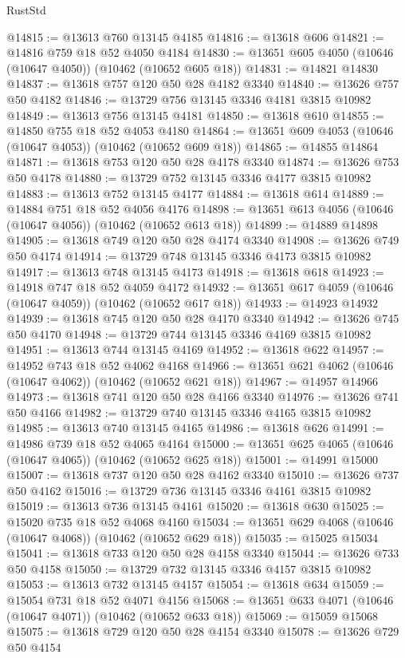\begin{lexlean}{RustStd}
\begin{coremodule}
@14815 := @13613 @760 @13145 @4185
@14816 := @13618 @606
@14821 := @14816 @759 @18 @52 @4050 @4184
@14830 := @13651 @605 @4050 (@10646 (@10647 @4050)) (@10462 (@10652 @605 @18))
@14831 := @14821 @14830
@14837 := @13618 @757 @120 @50 @28 @4182 @3340
@14840 := @13626 @757 @50 @4182
@14846 := @13729 @756 @13145 @3346 @4181 @3815 @10982
@14849 := @13613 @756 @13145 @4181
@14850 := @13618 @610
@14855 := @14850 @755 @18 @52 @4053 @4180
@14864 := @13651 @609 @4053 (@10646 (@10647 @4053)) (@10462 (@10652 @609 @18))
@14865 := @14855 @14864
@14871 := @13618 @753 @120 @50 @28 @4178 @3340
@14874 := @13626 @753 @50 @4178
@14880 := @13729 @752 @13145 @3346 @4177 @3815 @10982
@14883 := @13613 @752 @13145 @4177
@14884 := @13618 @614
@14889 := @14884 @751 @18 @52 @4056 @4176
@14898 := @13651 @613 @4056 (@10646 (@10647 @4056)) (@10462 (@10652 @613 @18))
@14899 := @14889 @14898
@14905 := @13618 @749 @120 @50 @28 @4174 @3340
@14908 := @13626 @749 @50 @4174
@14914 := @13729 @748 @13145 @3346 @4173 @3815 @10982
@14917 := @13613 @748 @13145 @4173
@14918 := @13618 @618
@14923 := @14918 @747 @18 @52 @4059 @4172
@14932 := @13651 @617 @4059 (@10646 (@10647 @4059)) (@10462 (@10652 @617 @18))
@14933 := @14923 @14932
@14939 := @13618 @745 @120 @50 @28 @4170 @3340
@14942 := @13626 @745 @50 @4170
@14948 := @13729 @744 @13145 @3346 @4169 @3815 @10982
@14951 := @13613 @744 @13145 @4169
@14952 := @13618 @622
@14957 := @14952 @743 @18 @52 @4062 @4168
@14966 := @13651 @621 @4062 (@10646 (@10647 @4062)) (@10462 (@10652 @621 @18))
@14967 := @14957 @14966
@14973 := @13618 @741 @120 @50 @28 @4166 @3340
@14976 := @13626 @741 @50 @4166
@14982 := @13729 @740 @13145 @3346 @4165 @3815 @10982
@14985 := @13613 @740 @13145 @4165
@14986 := @13618 @626
@14991 := @14986 @739 @18 @52 @4065 @4164
@15000 := @13651 @625 @4065 (@10646 (@10647 @4065)) (@10462 (@10652 @625 @18))
@15001 := @14991 @15000
@15007 := @13618 @737 @120 @50 @28 @4162 @3340
@15010 := @13626 @737 @50 @4162
@15016 := @13729 @736 @13145 @3346 @4161 @3815 @10982
@15019 := @13613 @736 @13145 @4161
@15020 := @13618 @630
@15025 := @15020 @735 @18 @52 @4068 @4160
@15034 := @13651 @629 @4068 (@10646 (@10647 @4068)) (@10462 (@10652 @629 @18))
@15035 := @15025 @15034
@15041 := @13618 @733 @120 @50 @28 @4158 @3340
@15044 := @13626 @733 @50 @4158
@15050 := @13729 @732 @13145 @3346 @4157 @3815 @10982
@15053 := @13613 @732 @13145 @4157
@15054 := @13618 @634
@15059 := @15054 @731 @18 @52 @4071 @4156
@15068 := @13651 @633 @4071 (@10646 (@10647 @4071)) (@10462 (@10652 @633 @18))
@15069 := @15059 @15068
@15075 := @13618 @729 @120 @50 @28 @4154 @3340
@15078 := @13626 @729 @50 @4154

\end{coremodule}
\end{lexlean}
